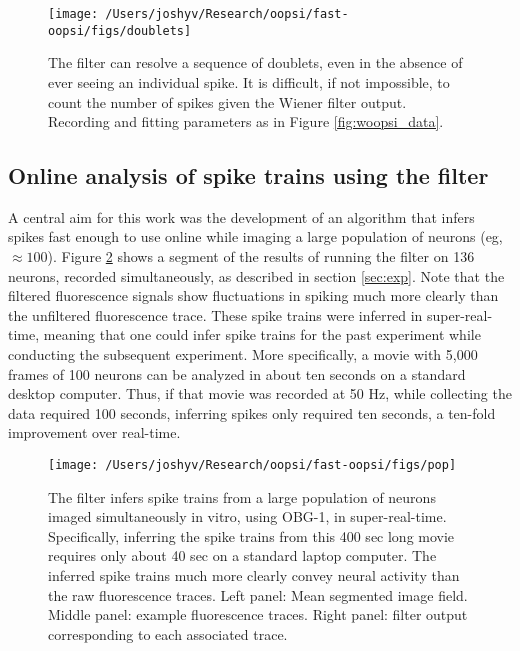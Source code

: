 \begin{figure}[h!]
\centering \texttt{[image: /Users/joshyv/Research/oopsi/fast-oopsi/figs/doublets]}
\caption[\foopsi filter outperforms Wiener filter on doublets]{The \foopsi filter can resolve a sequence of doublets, even in the absence of ever seeing an individual spike.  It is difficult, if not impossible, to count the number of spikes given the Wiener filter output.  Recording and fitting parameters as in Figure \ref{fig:woopsi_data}.} \label{fig:woopsi_data_doublets}
\end{figure}






\subsection{Online analysis of spike trains using the \foopsi filter}

A central aim for this work was the development of an algorithm that infers spikes fast enough to use online while imaging a large population of neurons (eg, $\approx 100$).  Figure \ref{fig:pop} shows a segment of the results of running the \foopsi filter on 136 neurons, recorded simultaneously, as described in section \ref{sec:exp}.  Note that the filtered fluorescence signals show fluctuations in spiking much more clearly than the unfiltered fluorescence trace. These spike trains were inferred in super-real-time, meaning that one could infer spike trains for the past experiment while conducting the subsequent experiment. More specifically, a movie with 5,000 frames of 100 neurons can be analyzed in about ten seconds on a standard desktop computer.  Thus, if that movie was recorded at 50 Hz, while collecting the data required 100 seconds, inferring spikes only required ten seconds, a ten-fold improvement over real-time.  


\begin{figure}[h!]
\begin{centering} 
\texttt{[image: /Users/joshyv/Research/oopsi/fast-oopsi/figs/pop]}
\end{centering}
\caption[\foopsi filter is robust and works online for populations of neurons]{The \foopsi filter infers spike trains from a large population of neurons imaged simultaneously in vitro, using OBG-1, in super-real-time.  Specifically, inferring the spike trains from this 400 sec long movie requires only about 40 sec on a standard laptop computer. The inferred spike trains much more clearly convey neural activity than the raw fluorescence traces.  Left panel: Mean segmented image field.  Middle panel: example fluorescence traces.  Right panel: \foopsi filter output corresponding to each associated trace.} \label{fig:pop}
\end{figure}


